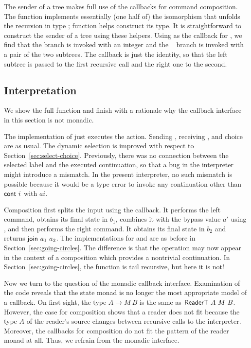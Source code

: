 \documentclass[acmsmall,screen]{acmart}
\begin{document}
The sender of a tree makes full use of the callbacks for command
composition. 
\cstSendTree
The function {\AsplitTree} implements essentially (one half of) the
isomorphism that unfolds the recursion in type {\AIntTree};
function {\AIntTreeF} helps construct its type. It is straightforward
to construct the sender of a tree using these helpers. Using
{\AsplitTree} as the callback for {\ACSELECT}, we find that the
{\Azero} branch is invoked with an integer and the {\Asuc~\Azero}
branch is invoked with a pair of the two subtrees. The {\Asplit}
callback is just the identity, so that the left subtree is passed to
the first recursive call and the right one to the second.

\subsection{Interpretation}
\label{sec:interpretation}


We show the full {\Aexecutor} function and finish with a rationale why
the callback interface in this section is not monadic.
\cstExec

The implementation of {\ACSKIP} just executes the action.
Sending  {\ACSEND}, receiving  {\ACRECV}, and choice {\ACCHOICE} are as usual.
The dynamic selection is improved with respect to
Section~\ref{sec:select-choice}. Previously, there was no connection
between the selected label and the executed continuation, so that a
bug in the interpreter might introduce a mismatch. In the present
interpreter, no such mismatch is possible because it would be a type
error to invoke any continuation other than $\Acont~i$ with $ai$.

Composition first splits the input using the {\Asplit} callback. It performs the left command, obtains its final state in
$b_1$, combines it with the bypass value $a'$ using {\Across}, and
then performs the right command. It obtains its final state in
$b_2$ and returns $\Ajoin~a_1~a_2$.
The implementations for {\AMU} and {\ACONTINUE} are as before in
Section~\ref{sec:going-circles}. The difference is that the
{\ACONTINUE} operation may now appear in the context of a composition
which provides a nontrivial continuation. In
Section~\ref{sec:going-circles}, the function {\Aexecutor} is tail
recursive, but here it is not!

Now we turn to the question of the monadic callback interface. 
Examination of the code reveals that the state monad is no longer the most appropriate model of a
callback. On first sight, the type $A \to 
M~B$ is the same as $\AReaderT~A~M~B $. However, the case 
for composition shows that a reader does not fit because
the type $A$ of the reader's source changes between recursive calls to
the interpreter. Moreover, the callbacks for composition do not fit
the pattern of the reader monad at all.
Thus, we refrain from the monadic interface.
\end{document}
